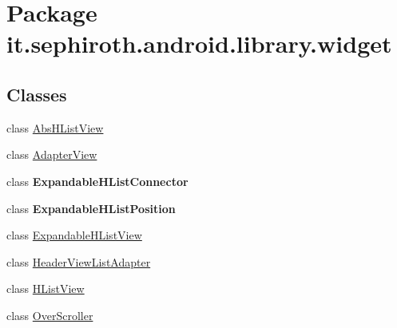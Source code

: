 \hypertarget{namespaceit_1_1sephiroth_1_1android_1_1library_1_1widget}{}\section{Package it.\+sephiroth.\+android.\+library.\+widget}
\label{namespaceit_1_1sephiroth_1_1android_1_1library_1_1widget}
\subsection*{Classes}
\begin{DoxyCompactItemize}
\item 
class \hyperlink{classit_1_1sephiroth_1_1android_1_1library_1_1widget_1_1_abs_h_list_view}{Abs\+H\+List\+View}
\item 
class \hyperlink{classit_1_1sephiroth_1_1android_1_1library_1_1widget_1_1_adapter_view}{Adapter\+View}
\item 
class {\bfseries Expandable\+H\+List\+Connector}
\item 
class {\bfseries Expandable\+H\+List\+Position}
\item 
class \hyperlink{classit_1_1sephiroth_1_1android_1_1library_1_1widget_1_1_expandable_h_list_view}{Expandable\+H\+List\+View}
\item 
class \hyperlink{classit_1_1sephiroth_1_1android_1_1library_1_1widget_1_1_header_view_list_adapter}{Header\+View\+List\+Adapter}
\item 
class \hyperlink{classit_1_1sephiroth_1_1android_1_1library_1_1widget_1_1_h_list_view}{H\+List\+View}
\item 
class \hyperlink{classit_1_1sephiroth_1_1android_1_1library_1_1widget_1_1_over_scroller}{Over\+Scroller}
\end{DoxyCompactItemize}
